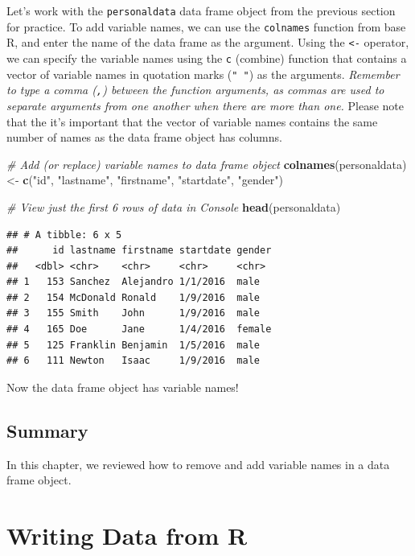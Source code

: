 \documentclass[]{book}
\newenvironment{Shaded}{\begin{snugshade}}{\end{snugshade}}
\newcommand{\KeywordTok}[1]{\textcolor[rgb]{0.13,0.29,0.53}{\textbf{#1}}}
\newcommand{\StringTok}[1]{\textcolor[rgb]{0.31,0.60,0.02}{#1}}
\newcommand{\CommentTok}[1]{\textcolor[rgb]{0.56,0.35,0.01}{\textit{#1}}}
\newcommand{\NormalTok}[1]{#1}
\begin{document}
Let's work with the \texttt{personaldata} data frame object from the
previous section for practice. To add variable names, we can use the
\texttt{colnames} function from base R, and enter the name of the data
frame as the argument. Using the \texttt{\textless{}-} operator, we can
specify the variable names using the \texttt{c} (combine) function that
contains a vector of variable names in quotation marks (\texttt{"\ "})
as the arguments. \emph{Remember to type a comma (\texttt{,}) between
the function arguments, as commas are used to separate arguments from
one another when there are more than one.} Please note that the it's
important that the vector of variable names contains the same number of
names as the data frame object has columns.

\begin{Shaded}
\begin{Highlighting}[]
\CommentTok{# Add (or replace) variable names to data frame object}
\KeywordTok{colnames}\NormalTok{(personaldata) <-}\StringTok{ }\KeywordTok{c}\NormalTok{(}\StringTok{"id"}\NormalTok{, }\StringTok{"lastname"}\NormalTok{, }\StringTok{"firstname"}\NormalTok{, }\StringTok{"startdate"}\NormalTok{, }\StringTok{"gender"}\NormalTok{)}

\CommentTok{# View just the first 6 rows of data in Console}
\KeywordTok{head}\NormalTok{(personaldata)}
\end{Highlighting}
\end{Shaded}

\begin{verbatim}
## # A tibble: 6 x 5
##      id lastname firstname startdate gender
##   <dbl> <chr>    <chr>     <chr>     <chr> 
## 1   153 Sanchez  Alejandro 1/1/2016  male  
## 2   154 McDonald Ronald    1/9/2016  male  
## 3   155 Smith    John      1/9/2016  male  
## 4   165 Doe      Jane      1/4/2016  female
## 5   125 Franklin Benjamin  1/5/2016  male  
## 6   111 Newton   Isaac     1/9/2016  male
\end{verbatim}

Now the data frame object has variable names!

\section{Summary}\label{summary}

In this chapter, we reviewed how to remove and add variable names in a
data frame object.

\chapter{Writing Data from R}\label{write}
\end{document}
